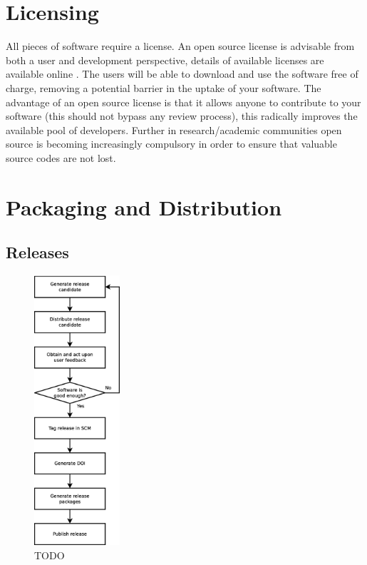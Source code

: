 \documentclass[jnr]{iosart2x}
\begin{document}
\section{Licensing}
\label{Licensing}

All pieces of software require a license.
An open source license is advisable from both a user and development perspective, details of available licenses are available online \cite{OSI_Licenses}.
The users will be able to download and use the software free of charge, removing a potential barrier in the uptake of your software.
The advantage of an open source license is that it allows anyone to contribute to your software (this should not bypass any review process), this radically improves the available pool of developers.
Further in research/academic communities open source is becoming increasingly compulsory in order to ensure that valuable source codes are not lost.

\section{Packaging and Distribution}
\label{Packaging and Distribution}

\subsection{Releases}
\label{Releases}

\begin{figure}
    \centering
    \includegraphics[height=10cm]{release_workflow.eps}
    \caption{TODO}
    \label{Release_Flowchart}
\end{figure}
\end{document}
